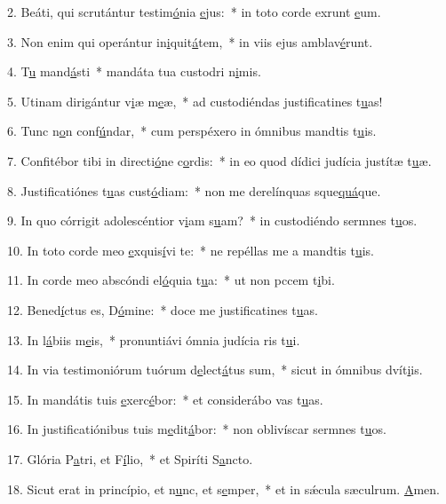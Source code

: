 2. Beáti, qui scrutántur testim\uline{ó}nia \uline{e}jus:~* in toto corde exrunt \uline{e}um.\par 
3. Non enim qui operántur in\uline{i}quit\uline{á}tem,~* in viis ejus amblav\uline{é}runt.\par 
4. T\uline{u} mand\uline{á}sti~* mandáta tua custodri n\uline{i}mis.\par 
5. Utinam dirigántur v\uline{i}æ m\uline{e}æ,~* ad custodiéndas justificatines t\uline{u}as!\par 
6. Tunc n\uline{o}n conf\uline{ú}ndar,~* cum perspéxero in ómnibus mandtis t\uline{u}is.\par 
7. Confitébor tibi in directi\uline{ó}ne c\uline{o}rdis:~* in eo quod dídici judícia justítæ t\uline{u}æ.\par 
8. Justificatiónes t\uline{u}as cust\uline{ó}diam:~* non me derelínquas sque\uline{quá}que.\par 
9. In quo córrigit adolescéntior v\uline{i}am s\uline{u}am?~* in custodiéndo sermnes t\uline{u}os.\par 
10. In toto corde meo \uline{e}xquis\uline{í}vi te:~* ne repéllas me a mandtis t\uline{u}is.\par 
11. In corde meo abscóndi el\uline{ó}quia t\uline{u}a:~* ut non pccem t\uline{i}bi.\par 
12. Bened\uline{í}ctus es, D\uline{ó}mine:~* doce me justificatines t\uline{u}as.\par 
13. In l\uline{á}biis m\uline{e}is,~* pronuntiávi ómnia judícia ris t\uline{u}i.\par 
14. In via testimoniórum tuórum d\uline{e}lect\uline{á}tus sum,~* sicut in ómnibus dvít\uline{i}is.\par 
15. In mandátis tuis \uline{e}xerc\uline{é}bor:~* et considerábo vas t\uline{u}as.\par 
16. In justificatiónibus tuis m\uline{e}dit\uline{á}bor:~* non oblivíscar sermnes t\uline{u}os.\par 
17. Glória P\uline{a}tri, et F\uline{í}lio,~* et Spiríti S\uline{a}ncto.\par 
18. Sicut erat in princípio, et n\uline{u}nc, et s\uline{e}mper,~* et in sǽcula sæculrum. \uline{A}men.\par 
